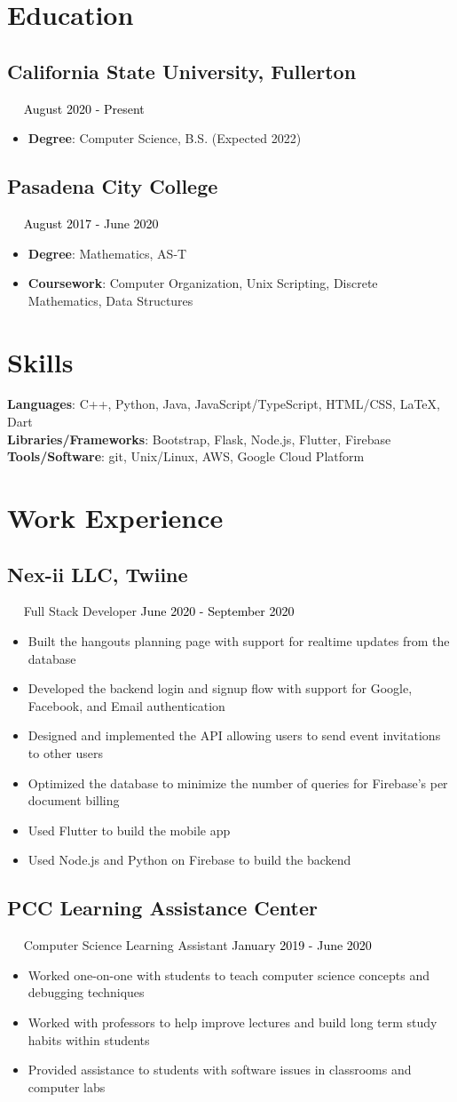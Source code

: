 \documentclass{article}
\newcommand{\resumesection}[3]{
    \subsection*{#1}
    \ 
    \ 
    \small
    \textcolor{csufgrey}{#2}
    \normalsize
    \hfill
    \textcolor{black}{#3}
    \normalsize
}
\begin{document}
\pagestyle{useheader}

\section*{Education}
\resumesection{California State University, Fullerton}{}{August 2020 - Present}
\begin{itemize}
    \item \textbf{Degree}: Computer Science, B.S. (Expected 2022)
\end{itemize}
\resumesection{Pasadena City College}{}{August 2017 - June 2020}
\begin{itemize}
    \item \textbf{Degree}: Mathematics, AS-T
    \item \textbf{Coursework}: Computer Organization, Unix Scripting, Discrete Mathematics, Data Structures
\end{itemize}
\hfill
\section*{Skills}
\textbf{Languages}: C++, Python, Java, JavaScript/TypeScript, HTML/CSS, {\selectfont\LaTeX}, Dart\\
\textbf{Libraries/Frameworks}: Bootstrap, Flask, Node.js, Flutter, Firebase\\
\textbf{Tools/Software}: git, Unix/Linux, AWS, Google Cloud Platform
\\
\section*{Work Experience}
\resumesection{Nex-ii LLC, Twiine}{Full Stack Developer}{June 2020 - September 2020}
\begin{itemize}
    \item Built the hangouts planning page with support for realtime updates from the database
    \item Developed the backend login and signup flow with support for Google, Facebook, and Email authentication
    \item Designed and implemented the API allowing users to send event invitations to other users
    \item Optimized the database to minimize the number of queries for Firebase's per document billing
    \item Used Flutter to build the mobile app
    \item Used Node.js and Python on Firebase to build the backend
\end{itemize}
\resumesection{PCC Learning Assistance Center}{Computer Science Learning Assistant}{January 2019 - June 2020}
\begin{itemize}
    \item Worked one-on-one with students to teach computer science concepts and debugging techniques
    \item Worked with professors to help improve lectures and build long term study habits within students
    \item Provided assistance to students with software issues in classrooms and computer labs
\end{itemize}
\hfill
\end{document}
